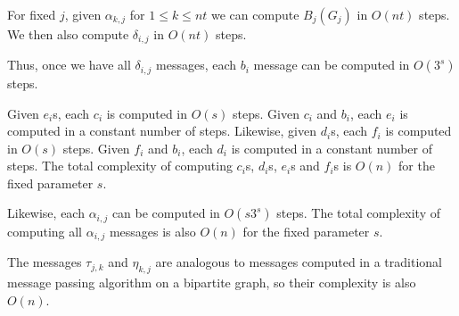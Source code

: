 For fixed $j$, given $\alpha_{k,j}$ for $1\leq k \leq nt$ we can
compute $B_j(G_j)$ in $O(nt)$ steps. We then also compute
$\delta_{i,j}$ in $O(nt)$ steps.

Thus, once we  have all $\delta_{i,j}$ messages, each $b_i$
message can be computed in $O(3^s)$ steps.

Given $e_i$s, each $c_i$ is computed in $O(s)$ steps. Given $c_i$
and $b_i$, each $e_i$ is  computed in a constant number of steps.
Likewise, given $d_i$s, each $f_i$ is computed in $O(s)$ steps.
Given $f_i$ and $b_i$, each $d_i$ is computed in a constant number
of steps. The total complexity of computing $c_i$s, $d_i$s, $e_i$s
and $f_i$s is $O(n)$ for the fixed parameter $s$.

Likewise, each $\alpha_{i,j}$ can be computed in $O(s3^s)$ steps.
The total complexity of computing all $\alpha_{i,j}$ messages is
also $O(n)$ for the fixed parameter $s$.



The messages $\tau_{j,k}$ and $\eta_{k,j}$ are analogous to
messages computed in a traditional message passing algorithm on a
bipartite graph, so their complexity is also $O(n)$.

